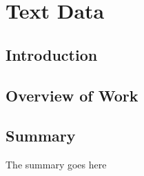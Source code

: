 \section{Text Data} \label{section:text}

\vspace{1.5cm}
\subsection{Introduction} 
\label{subsec:txt_intro}
\lipsum[1]

\subsection{{Overview of Work}} 
\label{subsec:overviewTxt}
\lipsum[1-4]

\subsection{Summary} 
\label{subsec:txt_summary}
The summary goes here